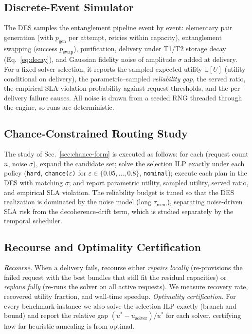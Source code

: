 \documentclass[twocolumn]{article}
\newcommand{\E}{\mathbb{E}}
\begin{document}
\subsection{Discrete-Event Simulator}
\label{sec:des}

The DES samples the entanglement pipeline event by event: elementary
pair generation (with $p_{\text{gen}}$ per attempt, retries within
capacity), entanglement swapping (success $p_{\text{swap}}$),
purification, delivery under T1/T2 storage decay
(Eq.~\eqref{eq:decay}), and Gaussian fidelity noise of amplitude
$\sigma$ added at delivery.  For a fixed solver selection, it reports
the sampled expected utility $\E[U]$ (utility conditional on delivery),
the parametric--sampled \emph{reliability gap}, the served ratio, the
empirical SLA-violation probability against request thresholds, and
the per-delivery failure causes.  All noise is drawn from a seeded RNG
threaded through the engine, so runs are deterministic.

\subsection{Chance-Constrained Routing Study}
\label{sec:chance}

The study of Sec.~\ref{sec:chance-form} is executed as follows: for
each (request count $n$, noise $\sigma$), expand the candidate set;
solve the selection ILP exactly under each policy
(\texttt{hard}, \texttt{chance($\varepsilon$)} for
$\varepsilon \in \{0.05,\dots,0.8\}$, \texttt{nominal}); execute each
plan in the DES with matching $\sigma$; and report parametric utility,
sampled utility, served ratio, and empirical SLA violation.  The
reliability budget is tuned so that the DES realization is dominated
by the noise model (long $\tau_{\text{mem}}$), separating
noise-driven SLA risk from the decoherence-drift term, which is
studied separately by the temporal scheduler.

\subsection{Recourse and Optimality Certification}
\label{sec:recourse-opt}

\emph{Recourse.}  When a delivery fails, recourse either
\emph{repairs locally} (re-provisions the failed request with the best
bundles that still fit the residual capacities) or \emph{replans
fully} (re-runs the solver on all active requests).  We measure
recovery rate, recovered utility fraction, and wall-time speedup.
\emph{Optimality certification.}  For every benchmark instance we also
solve the selection ILP exactly (branch and bound) and report the
relative gap $(u^\ast - u_{\text{solver}})/u^\ast$ for each solver,
certifying how far heuristic annealing is from optimal.
\end{document}

